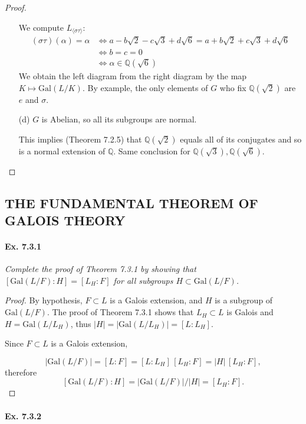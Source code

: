 \documentclass[11pt,a4paper]{article}
\newcommand{\Q}{\mathbb{Q}}
\newcommand{\Gal}{\mathrm{Gal}}
\begin{document}
\begin{proof}
\begin{enumerate}
We compute $L_{\langle \sigma \tau \rangle}$:
\begin{align*}
(\sigma\tau)(\alpha) = \alpha &\iff a-b\sqrt{2} - c\sqrt{3}+d \sqrt{6} = a+b\sqrt{2} + c\sqrt{3}+d \sqrt{6}\\
&\iff b=c=0\\
&\iff \alpha \in \Q(\sqrt{6})
\end{align*}
We obtain the left diagram from the right diagram by the map $K \mapsto \Gal(L/K)$. By example, the only elements of $G$ who fix $\Q(\sqrt{2})$ are $e$ and $\sigma$.

\item[(d)]
$G$ is Abelian, so all its subgroups are normal.

This implies (Theorem 7.2.5) that $\Q(\sqrt{2})$ equals all of its conjugates and so is a normal extension of $\Q$.  Same conclusion for $\Q(\sqrt{3}),\Q(\sqrt{6})$. 

\end{enumerate}
\end{proof}

\subsection{THE FUNDAMENTAL THEOREM OF GALOIS THEORY}

\paragraph{Ex. 7.3.1}

{\it Complete the proof of Theorem 7.3.1 by showing that $[\Gal(L/F) : H] = [L_H:F]$ for all subgroups $H \subset \Gal(L/F)$.
}

\begin{proof}
By hypothesis, $F \subset L$ is a Galois extension, and $H$ is a subgroup of $\Gal(L/F)$.
The proof of Theorem 7.3.1 shows that $L_H \subset L$ is Galois and  $H=\Gal(L/L_H)$, thus $\vert H \vert =|\Gal(L/L_H)| =  [L:L_H]$.

Since $F \subset L$ is a Galois extension, 

$$\vert \Gal(L/F) \vert =[L:F] = [L:L_H]\,[L_H:F] = \vert H \vert\, [L_H:F], $$
therefore
$$[\Gal(L/F):H] = \vert \Gal(L/F) \vert / \vert H \vert = [L_H:F].$$
\end{proof}

\paragraph{Ex. 7.3.2}
\end{document}
